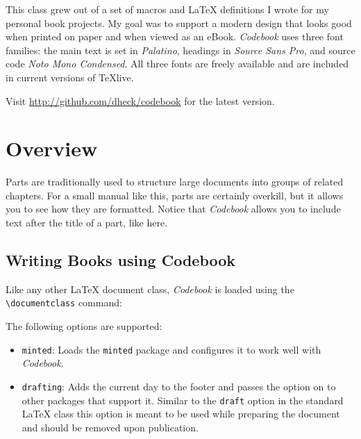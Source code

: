 \documentclass[minted]{codebook}
\begin{document}
This class grew out of a set of macros and \LaTeX{} definitions I wrote for my personal book projects.
My goal was to support a modern design that looks good when printed on paper and when viewed as an eBook.
\emph{Codebook} uses three font families: the main text is set in \emph{Palatino}, headings in \emph{Source Sans Pro}, and source code \emph{Noto Mono Condensed}.
All three fonts are freely available and are included in current versions of \TeX{}live.

Visit \url{http://github.com/dheck/codebook} for the latest version.


\mainmatter

\part{Overview}

Parts are traditionally used to structure large documents into groups of related chapters.
For a small manual like this, parts are certainly overkill, but it allows you to see how they are formatted.
Notice that \emph{Codebook} allows you to include text after the title of a part, like here.


\chapter{Writing Books using Codebook}


\chapterindent
Like any other \LaTeX{} document class, \emph{Codebook} is loaded using the \verb|\documentclass| command:
The following options are supported:
\begin{itemize}
  \item \texttt{minted}: Loads the \texttt{minted} package and configures it to work well with \emph{Codebook}.
  \item \texttt{drafting}: Adds the current day to the footer and passes the option on to other packages that support it.
  Similar to the \verb|draft| option in the standard \LaTeX{} class this option is meant to be used while preparing the document and should be removed upon publication.
\end{itemize}
\end{document}
